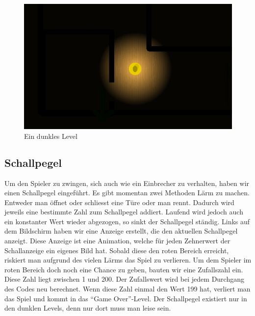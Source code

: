 \documentclass[11pt,a4paper]{scrbook}
\newcommand{\q}[1]{``#1''}
\begin{document}
\begin{figure}[h]     
\centering     
\includegraphics[scale=0.5]{img/dunkel.png}     
\caption{Ein dunkles Level}     
\end{figure}         
    
\subsection{Schallpegel}
\label{Schall}      
Um den Spieler zu zwingen, sich auch wie ein Einbrecher zu verhalten, haben wir einen Schallpegel eingeführt. Es gibt momentan zwei Methoden Lärm zu machen.
Entweder man öffnet oder schliesst eine Türe oder man rennt. 
Dadurch wird jeweils eine bestimmte Zahl zum Schallpegel addiert.
Laufend wird jedoch auch ein konstanter Wert wieder abgezogen, so sinkt der Schallpegel ständig.
Links auf dem Bildschirm haben wir eine Anzeige erstellt, die den aktuellen Schallpegel anzeigt.
Diese Anzeige ist eine Animation, welche für jeden Zehnerwert der Schallanzeige ein eigenes Bild hat.
Sobald diese den roten Bereich erreicht, riskiert man aufgrund des vielen Lärms das Spiel zu verlieren.
Um dem Spieler im roten Bereich doch noch eine Chance zu geben, bauten wir eine Zufallszahl ein.
Diese Zahl liegt zwischen 1 und 200. 
Der Zufallswert wird bei jedem Durchgang des Codes neu berechnet.
Wenn diese Zahl einmal den Wert 199 hat, verliert man das Spiel und kommt in das \q{Game Over}-Level.
Der Schallpegel existiert nur in den dunklen Levels, denn nur dort muss man leise sein.
\end{document}
